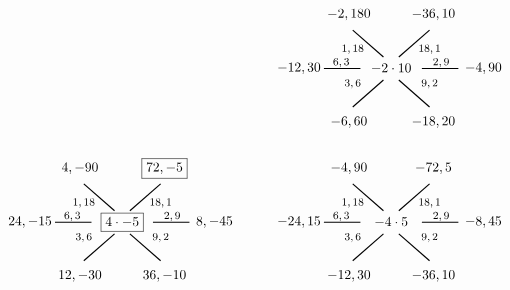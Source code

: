 \documentclass[11pt,letterpaper]{article}
\begin{document}
\[\begin{tikzpicture}
	\tikzset{shift={(7,0)}}

	\node at (0,0) {$-2 \cdot 10$};
	\node at (-1.0,0.5) {\footnotesize$1, 18$};
	\draw[line width=0.03cm,label={1}] (-0.2,0.3) -- (-1,1);
	\node at (-1.1,1.4) {$-2, 180$};
	\node at (1.0,0.5) {\footnotesize$18, 1$};
	\draw[line width=0.03cm] (0.2,0.3) -- (1,1);	
	\node at (1.1,1.4) {$-36, 10$};	
	\node at (1.3,0.15) {\footnotesize$2, 9$};
	\draw[line width=0.03cm] (0.8,0) -- (1.75,0);
	\node at (2.4,0) {$-4, 90$};
	\node at (1.0,-0.4) {\footnotesize$9, 2$};
	\draw[line width=0.03cm] (0.2,-0.3) -- (1,-1);
	\node at (1.1,-1.4) {$-18, 20$};
	\node at (-1.0,-0.4) {\footnotesize$3, 6$};
	\draw[line width=0.03cm,label={1}] (-0.2,-0.3) -- (-1,-1);
	\node at (-1.1,-1.4) {$-6, 60$};
	\node at (-1.3,0.15) {\footnotesize$6, 3$};
	\draw[line width=0.03cm] (-0.8,0) -- (-1.75,0);
	\node at (-2.4,0) {$-12, 30$};
	
	\tikzset{shift={(-7,-4)}}

	\node at (0,0) {\framebox{$4 \cdot -5$}};
	\node at (-1.0,0.5) {\footnotesize$1, 18$};
	\draw[line width=0.03cm,label={1}] (-0.2,0.3) -- (-1,1);
	\node at (-1.1,1.4) {$4, -90$};
	\node at (1.0,0.5) {\footnotesize$18, 1$};
	\draw[line width=0.03cm] (0.2,0.3) -- (1,1);	
	\node at (1.1,1.4) {\framebox{$72, -5$}};	
	\node at (1.3,0.15) {\footnotesize$2, 9$};
	\draw[line width=0.03cm] (0.8,0) -- (1.75,0);
	\node at (2.4,0) {$8, -45$};
	\node at (1.0,-0.4) {\footnotesize$9, 2$};
	\draw[line width=0.03cm] (0.2,-0.3) -- (1,-1);
	\node at (1.1,-1.4) {$36, -10$};
	\node at (-1.0,-0.4) {\footnotesize$3, 6$};
	\draw[line width=0.03cm,label={1}] (-0.2,-0.3) -- (-1,-1);
	\node at (-1.1,-1.4) {$12, -30$};
	\node at (-1.3,0.15) {\footnotesize$6, 3$};
	\draw[line width=0.03cm] (-0.8,0) -- (-1.75,0);
	\node at (-2.4,0) {$24, -15$};

	\tikzset{shift={(7,0)}}

	\node at (0,0) {$-4 \cdot 5$};
	\node at (-1.0,0.5) {\footnotesize$1, 18$};
	\draw[line width=0.03cm,label={1}] (-0.2,0.3) -- (-1,1);
	\node at (-1.1,1.4) {$-4, 90$};
	\node at (1.0,0.5) {\footnotesize$18, 1$};
	\draw[line width=0.03cm] (0.2,0.3) -- (1,1);	
	\node at (1.1,1.4) {$-72, 5$};	
	\node at (1.3,0.15) {\footnotesize$2, 9$};
	\draw[line width=0.03cm] (0.8,0) -- (1.75,0);
	\node at (2.4,0) {$-8, 45$};
	\node at (1.0,-0.4) {\footnotesize$9, 2$};
	\draw[line width=0.03cm] (0.2,-0.3) -- (1,-1);
	\node at (1.1,-1.4) {$-36, 10$};
	\node at (-1.0,-0.4) {\footnotesize$3, 6$};
	\draw[line width=0.03cm,label={1}] (-0.2,-0.3) -- (-1,-1);
	\node at (-1.1,-1.4) {$-12, 30$};
	\node at (-1.3,0.15) {\footnotesize$6, 3$};
	\draw[line width=0.03cm] (-0.8,0) -- (-1.75,0);
	\node at (-2.4,0) {$-24, 15$};
	\end{tikzpicture}
	\] \pspace
\end{document}
